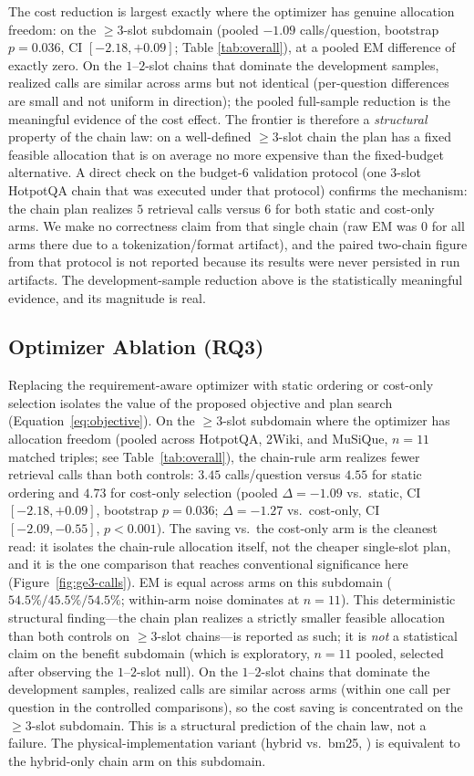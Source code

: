 The cost reduction is largest exactly where the optimizer has genuine
allocation freedom: on the $\ge 3$-slot subdomain (pooled $-1.09$
calls/question, bootstrap $p=0.036$, CI $[-2.18,+0.09]$; Table
\ref{tab:overall}), at a pooled EM difference of exactly zero. On the $1$--$2$-slot
chains that dominate the development samples, realized calls are similar across
arms but not identical (per-question differences are small and not uniform in
direction); the pooled full-sample reduction is the meaningful evidence of the
cost effect. The frontier is therefore a \emph{structural} property of the chain law: on a
well-defined $\ge 3$-slot chain the plan has a fixed feasible allocation that is
on average no more expensive than the fixed-budget alternative. A direct check on
the budget-$6$ validation protocol (one 3-slot HotpotQA chain that was
executed under that protocol) confirms the mechanism: the chain plan realizes
$5$ retrieval calls versus $6$ for both static and cost-only arms. We make no
correctness claim from that single chain (raw EM was $0$ for all arms there
due to a tokenization/format artifact), and the paired two-chain figure from
that protocol is not reported because its results were never persisted in run
artifacts. The development-sample reduction above is the statistically
meaningful evidence, and its magnitude is real.

\subsection{Optimizer Ablation (RQ3)}
Replacing the requirement-aware optimizer with static ordering or cost-only
selection isolates the value of the proposed objective and plan search
(Equation~\ref{eq:objective}). On the $\ge 3$-slot subdomain where the
optimizer has allocation freedom (pooled across HotpotQA, 2Wiki, and MuSiQue,
$n=11$ matched triples; see Table~\ref{tab:overall}), the chain-rule arm
realizes fewer retrieval calls than both controls: $3.45$ calls/question
versus $4.55$ for static ordering and $4.73$ for cost-only selection
(pooled $\Delta=-1.09$ vs.\ static, CI $[-2.18,+0.09]$, bootstrap $p=0.036$;
$\Delta=-1.27$ vs.\ cost-only, CI $[-2.09,-0.55]$, $p<0.001$). The saving vs.\
the cost-only arm is the cleanest read: it isolates the chain-rule allocation
itself, not the cheaper single-slot plan, and it is the one comparison that
reaches conventional significance here (Figure~\ref{fig:ge3-calls}). EM is
equal across arms on this
subdomain ($54.5\%/45.5\%/54.5\%$; within-arm noise dominates at $n=11$). This
deterministic structural finding---the chain plan realizes a strictly smaller
feasible allocation than both controls on $\ge 3$-slot chains---is reported as
such; it is \emph{not} a statistical claim on the benefit subdomain (which is
exploratory, $n=11$ pooled, selected after observing the $1$--$2$-slot null). On the
$1$--$2$-slot chains
that dominate the development samples, realized calls are similar across arms
(within one call per question in the controlled comparisons), so the cost saving
is concentrated on the $\ge 3$-slot subdomain. This is a structural prediction of
the chain law, not a failure. The physical-implementation variant (hybrid vs.\ bm25,
\code{slotrag-g7-chain-bm25}) is equivalent to the hybrid-only chain arm on
this subdomain.

